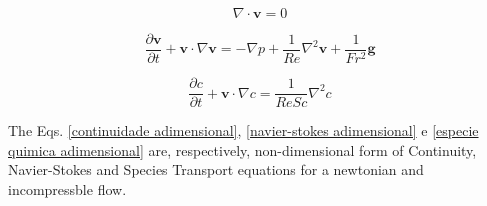 \begin{equation} \label{continuidade adimensional}
 \nabla \cdot \textbf{v} = 0
\end{equation}

\begin{equation} \label{navier-stokes adimensional}
 \frac{\partial \textbf{v}}{\partial t} 
 + 
 \textbf{v} \cdot \nabla \textbf{v}
 =
 -
 \nabla p
 +
 \frac{1}{Re} \nabla^{2} \textbf{v}
 +
 \frac{1}{Fr^{2}} \textbf{g}
\end{equation}

\begin{equation} \label{especie quimica adimensional}
 \frac{\partial c}{\partial t}
 +
 \textbf{v} \cdot \nabla c
 =
 \frac{1}{ReSc} \nabla^{2} c
\end{equation}

\medskip
The Eqs.
\ref{continuidade adimensional}, 
\ref{navier-stokes adimensional} e 
\ref{especie quimica adimensional}
are, respectively, non-dimensional form of Continuity,
Navier-Stokes and Species Transport equations
for a newtonian and incompressble flow.

